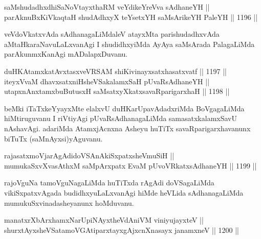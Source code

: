 \begin{shl}
saMshudadhxdhiSaNoV\s tayxthaRM veYdikeYreVva sAdhaneYH || \\
parAknuBxKiVkaqtaH shudAdhxyX teYsetxYH saMsArikeYH PaleYH \hfill || 1196 ||  
\end{shl}

\begin{artha}
veVdoVkatxvAda sAdhanagaLiMdaleV atayxMta parishudadhxvAda aMtaHkaraNavuLaLxvanAgi I shudidhxyiMda AyAya saMsArada PalagaLiMda parAkunmxKanAgi mADalapxDuvanu.
\end{artha}


\begin{shl}
duHKAtamxkatAvxtasxveVRSAM shiKivinayxsatxhasatxvatf \hfill || 1197 ||  \\
iteyxVvaM dhavxsatxniHsheVSakalamxSaH pUvaRsAdhaneYH || \\
utapxnAnxtamxbuButusxH saMsatxyXkatxsavaRparigarxhaH \hfill || 1198 ||  
\end{shl}

\begin{artha}
beMki iTaTxkeYyayxMte elalxvU duHKarUpavAdadxriMda BoVgagaLiMda hiMtiruguvanu I riVtiyAgi pUvaRsAdhanagaLiMda samasatxkalamxSavU nAshavAgi. adariMda AtamxjAcnxna Asheyu huTiTx savaRparigarxhavanunx biTuTx (saMnAyxsi)yAguvanu.
\end{artha}


\begin{shl}
rajasatxmoVjarAgAdidoVSAnAkiSxpatxsheVmuSiH || \\
mumukaSxvXvasAthxM saMpArxpatx EvaM pUvoVRkatxsAdhaneYH \hfill || 1199 ||  
\end{shl}

\begin{artha}
rajoVguNa tamoVguNagaLiMda huTiTxda rAgAdi doVSagaLiMda vikiSxpatxvAgada budidhxyuLaLxvanAgi hiMde heVLida sAdhanagaLiMda mumukuSxvinadasheyanunx hoMduvanu.
\end{artha}


\begin{shl}
manatxrXbArxhamxNarUpiNAyx\s theVdAniVM viniyujayxteV || \\
shurxtAyx\s sheVSatamoVGAtiparxtayxgAjxcnXnasayx janamxneV \hfill || 1200 ||  
\end{shl}

